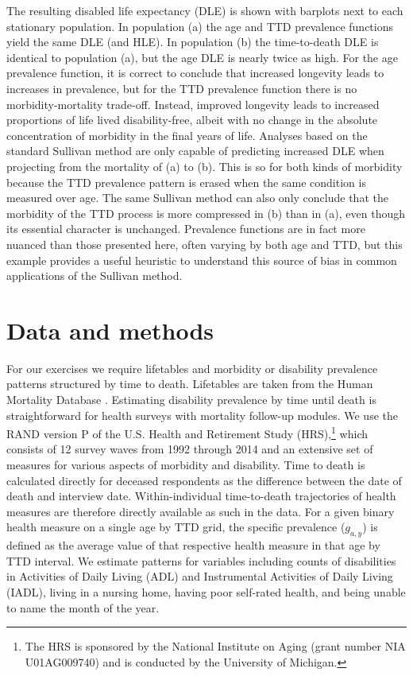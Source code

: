 \documentclass[12pt,oneside,a4paper]{article} %
\begin{document}
The resulting disabled life expectancy (DLE) is shown with
barplots next to each stationary population.
In population (a) the age and TTD prevalence functions yield
the same DLE (and HLE). In population (b) the time-to-death DLE is identical to
population (a), but the age DLE is nearly twice as high. For the
age prevalence function, it is correct to conclude that increased longevity leads to
increases in prevalence, but for the TTD prevalence function there is
no morbidity-mortality trade-off. Instead, improved longevity leads to increased proportions of life
lived disability-free, albeit with no change in the absolute concentration of morbidity in the final years of life. Analyses
based on the standard Sullivan method \citep{Sullivan1970} are only capable of
predicting increased DLE when projecting from the mortality of (a) to (b). This
is so for both kinds of morbidity because the TTD prevalence pattern
is erased when the same condition is measured over age. The same
Sullivan method can also only conclude that the morbidity of the TTD
process is more compressed in (b) than in (a), even though its essential
character is unchanged. Prevalence functions are in fact more nuanced than those
presented here, often varying by both age and TTD, but this example provides a useful heuristic to understand this source of bias in common applications of the Sullivan method.

\section{Data and methods}
\label{sec:datamethods}
For our exercises we require lifetables and morbidity or disability prevalence patterns structured by time to death. Lifetables are taken from the Human Mortality Database \citep{HMD2018}. Estimating disability prevalence by time until death is straightforward for health surveys with mortality follow-up modules. We use the RAND version P of the U.S. Health and Retirement Study (HRS),\footnote{The HRS is sponsored by the National Institute on Aging (grant number NIA U01AG009740) and is conducted by the University of Michigan.} which consists of 12 survey waves from 1992 through 2014 and an extensive set of measures for various aspects of morbidity and disability. Time to death is calculated directly for deceased respondents as the difference between the date of death and interview date. Within-individual time-to-death trajectories of health measures are therefore directly available as such in the data. For a given binary health measure on a single age by TTD grid, the specific prevalence ($g_{a,y}$) is defined as the average value of that respective health measure in that age by TTD interval. We estimate patterns for variables including
counts of disabilities in Activities of Daily Living (ADL) and
Instrumental Activities of Daily Living (IADL), living in a nursing home, having poor
self-rated health, and being unable to name the month of the year.
\end{document}
